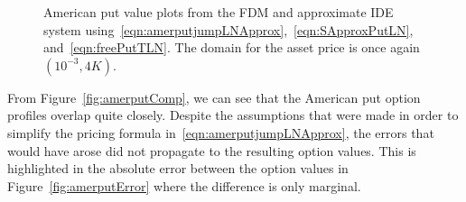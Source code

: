 	\begin{figure}[!h]
		\centering
		\caption{American put value plots from the FDM and approximate IDE system using~\eqref{eqn:amerputjumpLNApprox},~\eqref{eqn:SApproxPutLN}, and~\eqref{eqn:freePutTLN}. The domain for the asset price is once again $(10^{-3},4K)$.}
		\label{fig:amerputPlot}
\end{figure}
 
From Figure~\ref{fig:amerputComp}, we can see that the American put option profiles overlap quite closely. Despite the assumptions that were made in order to simplify the pricing formula in~\eqref{eqn:amerputjumpLNApprox}, the errors that would have arose did not propagate to the resulting option values. This is highlighted in the absolute error between the option values in Figure~\ref{fig:amerputError} where the difference is only marginal.

